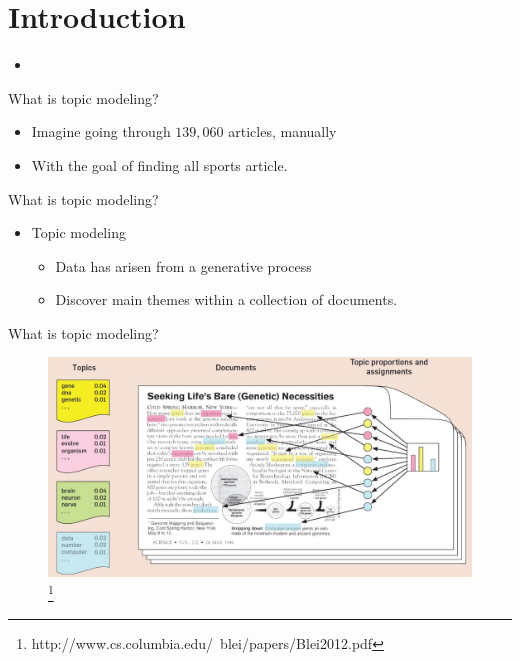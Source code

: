 \section{Introduction}

\begin{frame}{\insertsection}{}
	\begin{itemize}
		\item 
	\end{itemize}
\end{frame}

\begin{frame}{\insertsection}{What is topic modeling?}
	\begin{itemize}
		\item Imagine going through $139,060$ articles, manually
		\item With the goal of finding all sports article.
	\end{itemize}
\end{frame}

\begin{frame}{\insertsection}{What is topic modeling?}
	\begin{itemize}
		\item Topic modeling
  		\begin{itemize}
			\item Data has arisen from a generative process
			\item Discover main themes within a collection of documents.
		\end{itemize}
	\end{itemize}
\end{frame}

\begin{frame}{\insertsection}{What is topic modeling?}
	\begin{figure}
		\includegraphics[width=\textwidth]{figures/topic_modeling_visual.JPG}
		\let\thefootnote\relax\footnote{\tiny{http://www.cs.columbia.edu/~blei/papers/Blei2012.pdf}}
	\end{figure}
\end{frame}

